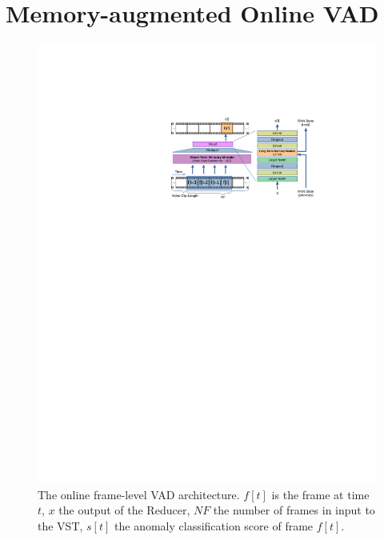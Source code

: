 \section{Memory-augmented Online VAD}
\label{sec:theory}

\fboxsep=1mm%
\fboxrule=1pt%


\begin{figure}[!t]
            \centerline{\includegraphics[clip, trim=236 510 113 133, width=\linewidth]{images/arch-rx.pdf}}
        \caption{The online frame-level VAD architecture. $f[t]$ is the frame at time $t$, $x$ the output of the Reducer, $\mathit{NF}$ the number of frames in input to the VST, $s[t]$ the anomaly classification score of frame $f[t]$.\label{fig:arch}}
\end{figure}


